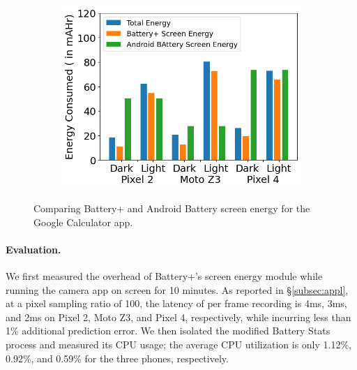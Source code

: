 \begin{figure}[tp]
\begin{minipage}{0.35\columnwidth}
        \vspace{-0.2in}
	\label{fig:tool2_screenshot}
\end{minipage}
\hfill
\begin{minipage}{0.60\columnwidth}
	\begin{subfigure}[]{\textwidth}
		\includegraphics[width=\textwidth]{figure/battery+_screen_energy_compare.png}
	\end{subfigure}
        \vspace{-0.1in}
	\caption{Comparing Battery+ and Android Battery screen energy for the Google Calculator app.}
	\label{fig:tool2_battery_compare}
        \vspace{-0.2in}
\end{minipage}
\end{figure}

\paragraph{Evaluation.}
We first measured the overhead of Battery+'s
screen energy module while running the camera app on
screen for 10 minutes.  As reported in \S\ref{subsec:appl}, at a pixel
sampling ratio of 100, the latency of per frame recording is
4ms, 3ms, and 2ms on Pixel 2, Moto Z3, and Pixel 4, respectively, while incurring less than
1\% 
additional prediction error.  We then isolated the modified Battery Stats
process and measured its CPU usage; the average CPU utilization is
only 1.12\%, 0.92\%, and 0.59\% for the three phones, respectively.

